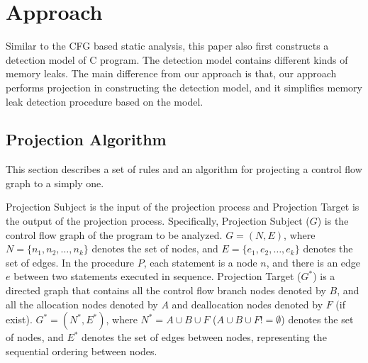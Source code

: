 \section{Approach}\label{sec:approach}
Similar to the CFG based static analysis, this paper also first constructs a detection model of C program. The detection model contains different kinds of memory leaks. The main difference from our approach is that, our approach performs projection in constructing the detection model, and it simplifies memory leak detection procedure based on the model.

\subsection{Projection Algorithm}

This section describes a set of rules and an algorithm for projecting a control flow graph to a simply one. 


Projection Subject is the input of the projection process and Projection Target is the output of the projection process. Specifically, Projection Subject ($G$) is the control flow graph of the program to be analyzed. $G=(N, E)$, where $N = \{n_1, n_2, \ldots, n_k\}$ denotes the set of nodes, and $E = \{e_1, e_2, \ldots, e_k\}$ denotes the set of edges. In the procedure $P$, each statement is a node $n$, and there is an edge $e$ between two statements executed in sequence. Projection Target ($G^*$) is a directed graph that contains all the control flow branch nodes denoted by $B$, and all the allocation nodes denoted by $A$ and deallocation nodes denoted by $F$ (if exist). $G^* = (N^*, E^*)$, where $N^* = A\cup B\cup F$ ($A\cup B\cup F!=\emptyset$) denotes the set of nodes, and $E^*$ denotes the set of edges between nodes, representing the sequential ordering between nodes.


